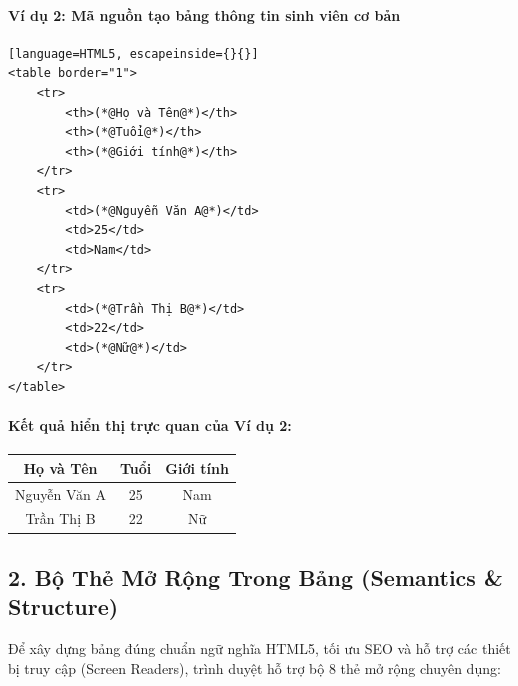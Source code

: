 \paragraph{Ví dụ 2: Mã nguồn tạo bảng thông tin sinh viên cơ bản}
\begin{codeWindow}
\begin{lstlisting}[language=HTML5, escapeinside={}{}]
<table border="1">
    <tr>
        <th>(*@Họ và Tên@*)</th>
        <th>(*@Tuổi@*)</th>
        <th>(*@Giới tính@*)</th>
    </tr>
    <tr>
        <td>(*@Nguyễn Văn A@*)</td>
        <td>25</td>
        <td>Nam</td>
    </tr>
    <tr>
        <td>(*@Trần Thị B@*)</td>
        <td>22</td>
        <td>(*@Nữ@*)</td>
    </tr>
</table>
\end{lstlisting}
\end{codeWindow}

\paragraph{\textbf{Kết quả hiển thị trực quan của Ví dụ 2:}}
\begin{prettyTableBox}[Kết Quả Hiển Thị Bảng HTML Khi Khai Báo Thuộc Tính border="1"]
\centering
\vspace{4pt}
\bgroup
\renewcommand{\arraystretch}{1.4}
\setlength{\tabcolsep}{14pt}
\begin{tabular}{|c|c|c|}
\hline
\textbf{Họ và Tên} & \textbf{Tuổi} & \textbf{Giới tính} \\
\hline
Nguyễn Văn A & 25 & Nam \\
\hline
Trần Thị B & 22 & Nữ \\
\hline
\end{tabular}
\egroup
\vspace{4pt}
\end{prettyTableBox}

\subsection{2. Bộ Thẻ Mở Rộng Trong Bảng (Semantics \& Structure)}

Để xây dựng bảng đúng chuẩn ngữ nghĩa HTML5, tối ưu SEO và hỗ trợ các thiết bị truy cập (Screen Readers), trình duyệt hỗ trợ bộ 8 thẻ mở rộng chuyên dụng:

